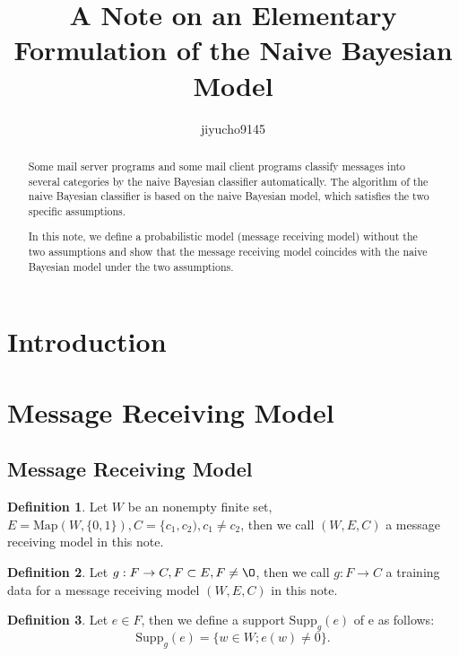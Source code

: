 \documentclass[11pt, a4note]{article}
\theoremstyle{definition}
\newtheorem{definition}{Definition}[section]
\begin{document}
\title{A Note on an Elementary Formulation of the Naive Bayesian Model}
\author{jiyucho9145}
\maketitle
\begin{abstract}
Some mail server programs and some mail client programs classify messages into several categories
by the naive Bayesian classifier automatically. The algorithm of the naive Bayesian classifier is based on
the naive Bayesian model, which satisfies the two specific assumptions.

In this note, we define a probabilistic model (message receiving model) without the two assumptions
and show that the message receiving model coincides with the naive Bayesian model under the two assumptions.
\end{abstract}

\newpage
\tableofcontents

\newpage
\section{Introduction}

\section{Message Receiving Model}

\subsection{Message Receiving Model}

\begin{definition}
Let $ W $ be an nonempty finite set, $ E = \mathrm{Map}(W, \{0, 1\}), C = \{c_{1}, c_{2}), c_{1} \ne c_{2} $,
then we call $ (W, E, C) $ a message receiving model in this note.
\end{definition}

\begin{definition}
Let $ g : F \to C, F \subset E, F \ne \O $, then we call $ g : F \to C $ a training data for a message receiving model $ (W, E, C) $ in this note.
\end{definition}

\begin{definition}
Let $ e \in F $, then we define a support $ \mathrm{Supp}_{g}(e) $ of e as follows:
\begin{equation}
\mathrm{Supp}_{g}(e) = \{ w \in W ; e(w) \ne 0\}.
\end{equation}
\end{definition}
\end{document}
